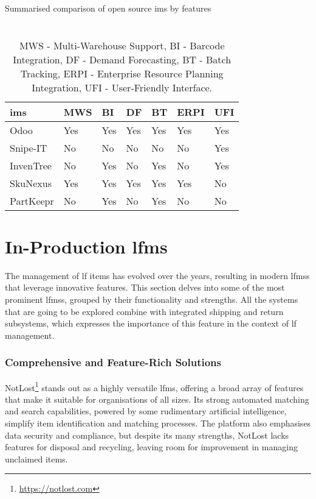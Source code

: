 \begin{table}[!htb]
\centering
\caption{Summarised comparison of open source \acl{ims} by features}
\begin{tabular}{lllllll}
\hline
\textbf{\ac{ims}} & \textbf{MWS} & \textbf{BI} & \textbf{DF} & \textbf{BT} & \textbf{ERPI} & \textbf{UFI} \\
\hline
Odoo & Yes & Yes & Yes & Yes & Yes & Yes \\
\hline
Snipe-IT & No & No & No & No & No & Yes \\
\hline
InvenTree & No & Yes & No & Yes & No & Yes \\
\hline
SkuNexus & Yes & Yes & Yes & Yes & Yes & No \\
\hline
PartKeepr & No & Yes & No & Yes & No & No \\
\hline
\end{tabular}
\caption*{\\MWS - Multi-Warehouse Support, BI - Barcode Integration, DF - Demand Forecasting, BT - Batch Tracking, ERPI - Enterprise Resource Planning Integration, UFI - User-Friendly Interface.}
\label{tab:ims_comparison}
\end{table}


\section{In-Production \acl{lfms}} \label{sec:in-production-solutions}

The management of \ac{lf} items has evolved over the years, resulting in modern \acp{lfms} that leverage innovative features. This section delves into some of the most prominent \acp{lfms}, grouped by their functionality and strengths. All the systems that are going to be explored combine with integrated shipping and return subsystems, which expresses the importance of this feature in the context of \ac{lf} management.

\subsubsection{Comprehensive and Feature-Rich Solutions} \label{subsubsec:comprehensive-solutions}

NotLost\footnote{\url{https://notlost.com}} stands out as a highly versatile \ac{lfms}, offering a broad array of features that make it suitable for organisations of all sizes. Its strong automated matching and search capabilities, powered by some rudimentary artificial intelligence, simplify item identification and matching processes. The platform also emphasises data security and compliance, but despite its many strengths, NotLost lacks features for disposal and recycling, leaving room for improvement in managing unclaimed items.

